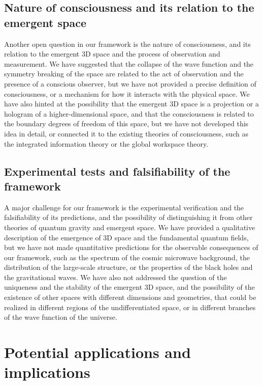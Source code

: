 \subsection{Nature of consciousness and its relation to the emergent space}
Another open question in our framework is the nature of consciousness, and its relation to the emergent 3D space and the process of observation and measurement. We have suggested that the collapse of the wave function and the symmetry breaking of the space are related to the act of observation and the presence of a conscious observer, but we have not provided a precise definition of consciousness, or a mechanism for how it interacts with the physical space. We have also hinted at the possibility that the emergent 3D space is a projection or a hologram of a higher-dimensional space, and that the consciousness is related to the boundary degrees of freedom of this space, but we have not developed this idea in detail, or connected it to the existing theories of consciousness, such as the integrated information theory or the global workspace theory.

\subsection{Experimental tests and falsifiability of the framework}
A major challenge for our framework is the experimental verification and the falsifiability of its predictions, and the possibility of distinguishing it from other theories of quantum gravity and emergent space. We have provided a qualitative description of the emergence of 3D space and the fundamental quantum fields, but we have not made quantitative predictions for the observable consequences of our framework, such as the spectrum of the cosmic microwave background, the distribution of the large-scale structure, or the properties of the black holes and the gravitational waves. We have also not addressed the question of the uniqueness and the stability of the emergent 3D space, and the possibility of the existence of other spaces with different dimensions and geometries, that could be realized in different regions of the undifferentiated space, or in different branches of the wave function of the universe.

\section{Potential applications and implications}

